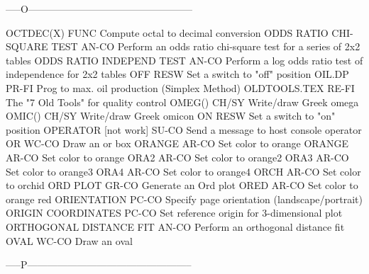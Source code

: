 -----O--------------------------------------------------

OCTDEC(X)                   FUNC  Compute octal to decimal conversion
ODDS RATIO CHI-SQUARE TEST  AN-CO Perform an odds ratio chi-square test for a series of 2x2 tables
ODDS RATIO INDEPEND TEST    AN-CO Perform a log odds ratio test of independence for 2x2 tables
OFF                         RESW  Set a switch to "off" position
OIL.DP                      PR-FI Prog to max. oil production (Simplex Method)
OLDTOOLS.TEX                RE-FI The "7 Old Tools" for quality control
OMEG()                      CH/SY Write/draw Greek omega
OMIC()                      CH/SY Write/draw Greek omicon
ON                          RESW  Set a switch to "on" position
OPERATOR     [not work]     SU-CO Send a message to host console operator
OR                          WC-CO Draw an or box
ORANGE                      AR-CO Set color to orange
ORANGE                      AR-CO Set color to orange
ORA2                        AR-CO Set color to orange2
ORA3                        AR-CO Set color to orange3
ORA4                        AR-CO Set color to orange4
ORCH                        AR-CO Set color to orchid
ORD PLOT                    GR-CO Generate an Ord plot
ORED                        AR-CO Set color to orange red
ORIENTATION                 PC-CO Specify page orientation (landscape/portrait)
ORIGIN COORDINATES          PC-CO Set reference origin for 3-dimensional plot
ORTHOGONAL DISTANCE FIT     AN-CO Perform an orthogonal distance fit
OVAL                        WC-CO Draw an oval

-----P--------------------------------------------------


